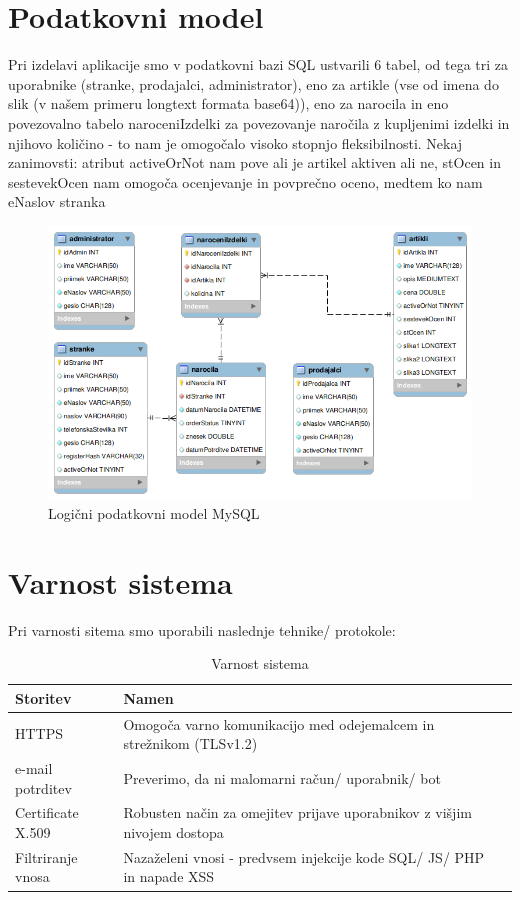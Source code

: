 \documentclass[a4paper,12pt]{report}
\begin{document}
\chapter{Podatkovni model}

Pri izdelavi aplikacije smo v podatkovni bazi SQL ustvarili 6 tabel, od tega tri za uporabnike (stranke, prodajalci, administrator), eno za artikle (vse od imena do slik (v našem primeru longtext formata base64)), eno za narocila in eno povezovalno tabelo naroceniIzdelki za povezovanje naročila z kupljenimi izdelki in njihovo količino - to nam je omogočalo visoko stopnjo fleksibilnosti. Nekaj zanimovsti: atribut activeOrNot nam pove ali je artikel aktiven ali ne, stOcen in sestevekOcen nam omogoča ocenjevanje in povprečno oceno, medtem ko nam eNaslov stranka

\begin{figure}[htb]
	\centering
	\includegraphics[width=15cm]{sql_baza.png}
	\caption{Logični podatkovni model MySQL}
\label{fig:1}
\end{figure}

\chapter{Varnost sistema}

Pri varnosti sitema smo uporabili naslednje tehnike/ protokole:
\begin{table}[htbp]
\caption{Varnost sistema}
\label{tab1}
\begin{center}
\begin{tabular}{llp{3cm}}
\hline
Storitev & Namen \\
\hline
HTTPS &  Omogoča varno komunikacijo med odejemalcem in strežnikom (TLSv1.2)  \\
e-mail potrditev & Preverimo, da ni malomarni račun/ uporabnik/ bot\\
Certificate X.509 & Robusten način za omejitev prijave uporabnikov z višjim nivojem dostopa\\
Filtriranje vnosa& Nazaželeni vnosi - predvsem injekcije kode SQL/ JS/ PHP in napade XSS\\
\hline
\end{tabular}
\end{center}
\end{table}
\end{document}
